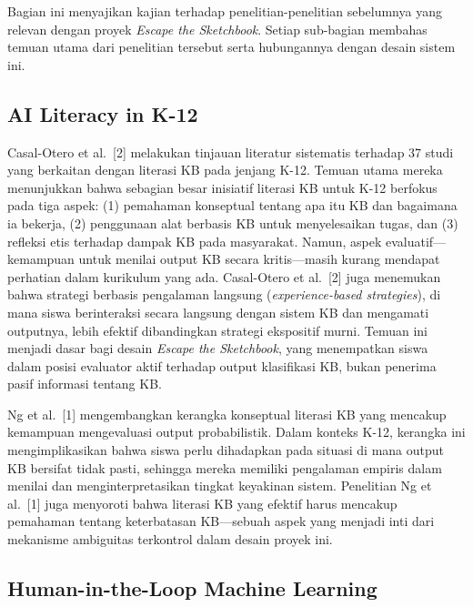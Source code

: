 \documentclass[10pt,twoside,openright]{report}
\begin{document}
Bagian ini menyajikan kajian terhadap penelitian-penelitian sebelumnya yang relevan dengan proyek \textit{Escape the Sketchbook}. Setiap sub-bagian membahas temuan utama dari penelitian tersebut serta hubungannya dengan desain sistem ini.

\subsection{AI Literacy in K-12}
\label{subsec:penelitian-ai-literacy-k12}

Casal-Otero et al.\ [2] melakukan tinjauan literatur sistematis terhadap 37 studi yang berkaitan dengan literasi KB pada jenjang K-12. Temuan utama mereka menunjukkan bahwa sebagian besar inisiatif literasi KB untuk K-12 berfokus pada tiga aspek: (1) pemahaman konseptual tentang apa itu KB dan bagaimana ia bekerja, (2) penggunaan alat berbasis KB untuk menyelesaikan tugas, dan (3) refleksi etis terhadap dampak KB pada masyarakat. Namun, aspek evaluatif---kemampuan untuk menilai output KB secara kritis---masih kurang mendapat perhatian dalam kurikulum yang ada. Casal-Otero et al.\ [2] juga menemukan bahwa strategi berbasis pengalaman langsung (\textit{experience-based strategies}), di mana siswa berinteraksi secara langsung dengan sistem KB dan mengamati outputnya, lebih efektif dibandingkan strategi ekspositif murni. Temuan ini menjadi dasar bagi desain \textit{Escape the Sketchbook}, yang menempatkan siswa dalam posisi evaluator aktif terhadap output klasifikasi KB, bukan penerima pasif informasi tentang KB.

Ng et al.\ [1] mengembangkan kerangka konseptual literasi KB yang mencakup kemampuan mengevaluasi output probabilistik. Dalam konteks K-12, kerangka ini mengimplikasikan bahwa siswa perlu dihadapkan pada situasi di mana output KB bersifat tidak pasti, sehingga mereka memiliki pengalaman empiris dalam menilai dan menginterpretasikan tingkat keyakinan sistem. Penelitian Ng et al.\ [1] juga menyoroti bahwa literasi KB yang efektif harus mencakup pemahaman tentang keterbatasan KB---sebuah aspek yang menjadi inti dari mekanisme ambiguitas terkontrol dalam desain proyek ini.

\subsection{Human-in-the-Loop Machine Learning}
\label{subsec:penelitian-hitl-ml}
\end{document}
